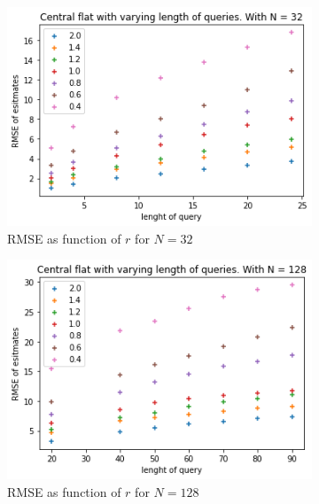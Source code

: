\documentclass[11pt]{article}
\theoremstyle{definition}
\begin{document}
\begin{figure}[H]
\centering
\begin{subfigure}{.4\textwidth}
  \centering
  \includegraphics[width=\linewidth]{figures/central_flat/varying_r/cen_flat_varying_length_N=32.png}
  \caption{RMSE as function of $r$ for $N=32$}
  \label{fig:1}
\end{subfigure}%
\begin{subfigure}{.4\textwidth}
  \centering
  \includegraphics[width=\linewidth]{figures/central_flat/varying_r/cen_flat_varying_length_N=128.png}
  \caption{RMSE as function of $r$ for $N=128$}
  \label{fig:2}
\end{subfigure}
\begin{subfigure}{.4\textwidth}
  \centering

\end{subfigure}
\end{figure}
\end{document}
